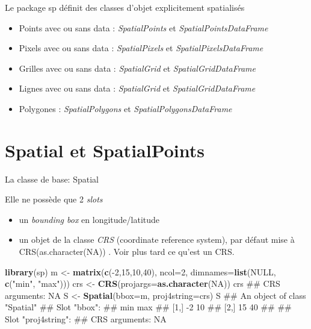 \documentclass[8pt,ignorenonframetext,]{beamer}
\newenvironment{Shaded}{\begin{snugshade}}{\end{snugshade}}
\newcommand{\KeywordTok}[1]{\textcolor[rgb]{0.13,0.29,0.53}{\textbf{{#1}}}}
\newcommand{\DataTypeTok}[1]{\textcolor[rgb]{0.13,0.29,0.53}{{#1}}}
\newcommand{\DecValTok}[1]{\textcolor[rgb]{0.00,0.00,0.81}{{#1}}}
\newcommand{\StringTok}[1]{\textcolor[rgb]{0.31,0.60,0.02}{{#1}}}
\newcommand{\OtherTok}[1]{\textcolor[rgb]{0.56,0.35,0.01}{{#1}}}
\newcommand{\NormalTok}[1]{{#1}}
\providecommand{\tightlist}{%
\setlength{\itemsep}{0pt}\setlength{\parskip}{0pt}}
\begin{document}
\begin{frame}{Le package sp définit des classes d'objet explicitement
spatialisés}

\begin{itemize}
\tightlist
\item
  Points avec ou sans data : \emph{SpatialPoints} et
  \emph{SpatialPointsDataFrame}
\item
  Pixels avec ou sans data : \emph{SpatialPixels} et
  \emph{SpatialPixelsDataFrame}
\item
  Grilles avec ou sans data : \emph{SpatialGrid} et
  \emph{SpatialGridDataFrame}
\item
  Lignes avec ou sans data : \emph{SpatialGrid} et
  \emph{SpatialGridDataFrame}
\item
  Polygones : \emph{SpatialPolygons} et \emph{SpatialPolygonsDataFrame}
\end{itemize}

\end{frame}

\section{Spatial et SpatialPoints}\label{spatial-et-spatialpoints}

\begin{frame}[fragile]{La classe de base: Spatial}

Elle ne possède que 2 \emph{slots}

\begin{itemize}
\tightlist
\item
  un \emph{bounding box} en longitude/latitude
\item
  un objet de la classe \emph{CRS} (coordinate reference system), par
  défaut mise à CRS(as.character(NA)) . Voir plus tard ce qu'est un CRS.
\end{itemize}

\begin{Shaded}
\begin{Highlighting}[]
\KeywordTok{library}\NormalTok{(sp)}
\NormalTok{m <-}\StringTok{ }\KeywordTok{matrix}\NormalTok{(}\KeywordTok{c}\NormalTok{(-}\DecValTok{2}\NormalTok{,}\DecValTok{15}\NormalTok{,}\DecValTok{10}\NormalTok{,}\DecValTok{40}\NormalTok{), }\DataTypeTok{ncol=}\DecValTok{2}\NormalTok{, }\DataTypeTok{dimnames=}\KeywordTok{list}\NormalTok{(}\OtherTok{NULL}\NormalTok{, }\KeywordTok{c}\NormalTok{(}\StringTok{"min"}\NormalTok{, }\StringTok{"max"}\NormalTok{)))}
\NormalTok{crs <-}\StringTok{ }\KeywordTok{CRS}\NormalTok{(}\DataTypeTok{projargs=}\KeywordTok{as.character}\NormalTok{(}\OtherTok{NA}\NormalTok{))}
\NormalTok{crs}
\NormalTok{## CRS arguments: NA}
\NormalTok{S <-}\StringTok{ }\KeywordTok{Spatial}\NormalTok{(}\DataTypeTok{bbox=}\NormalTok{m, }\DataTypeTok{proj4string=}\NormalTok{crs)}
\NormalTok{S}
\NormalTok{## An object of class "Spatial"}
\NormalTok{## Slot "bbox":}
\NormalTok{##      min max}
\NormalTok{## [1,]  -2  10}
\NormalTok{## [2,]  15  40}
\NormalTok{## }
\NormalTok{## Slot "proj4string":}
\NormalTok{## CRS arguments: NA}
\end{Highlighting}
\end{Shaded}

\end{frame}
\end{document}
